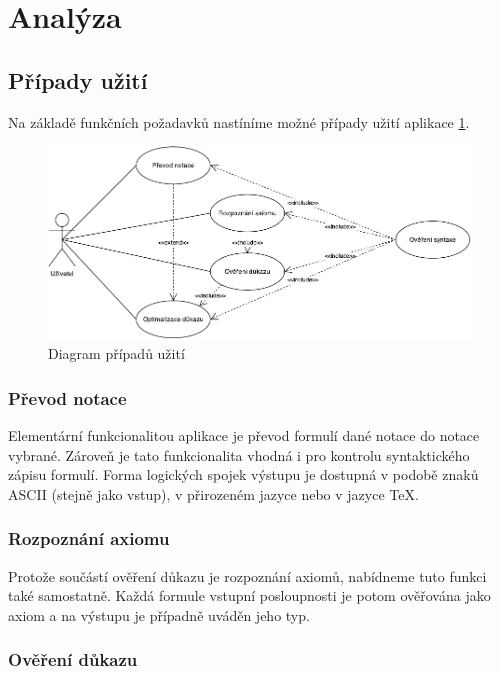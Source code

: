 \documentclass[thesis=B,czech,hidelinks]{thesis}[2012/06/26]
\begin{document}
\section{Analýza}

\subsection{Případy užití}
\label{sec:use_cases}

Na základě funkčních požadavků nastíníme možné případy užití aplikace \ref{fig:use_cases}.

\begin{figure}
\centering
\caption{Diagram případů užití}
\label{fig:use_cases}
\includegraphics{diagrams/use_cases}
\end{figure}

\subsubsection{Převod notace}

Elementární funkcionalitou aplikace je převod formulí dané notace do notace vybrané. Zároveň je tato funkcionalita vhodná i pro kontrolu syntaktického zápisu formulí. Forma logických spojek výstupu je dostupná v podobě znaků ASCII (stejně jako vstup), v přirozeném jazyce nebo v jazyce \TeX.

\subsubsection{Rozpoznání axiomu}

Protože součástí ověření důkazu je rozpoznání axiomů, nabídneme tuto funkci také samostatně. Každá formule vstupní posloupnosti je potom ověřována jako axiom a na výstupu je případně uváděn jeho typ.

\subsubsection{Ověření důkazu}
\end{document}

